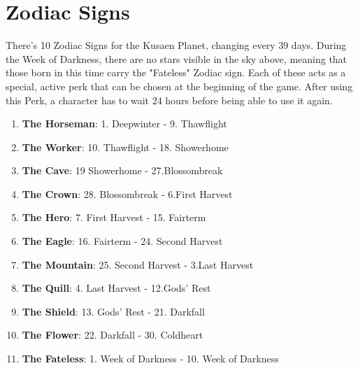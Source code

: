 \section{Zodiac Signs}
There's 10 Zodiac Signs for the Kusaen Planet, changing every 39 days. During the Week of Darkness, there are no stars visible in the sky above, meaning that those born in this time carry the "Fateless" Zodiac sign. Each of these acts as a special, active perk that can be chosen at the beginning of the game. After using this Perk, a character has to wait 24 hours before being able to use it again.\\

\begin{enumerate}
	\item \textbf{The Horseman}: 1. Deepwinter - 9. Thawflight
	\item \textbf{The Worker}: 10. Thawflight - 18. Showerhome
	\item \textbf{The Cave}: 19 Showerhome - 27.Blossombreak
	\item \textbf{The Crown}: 28. Blossombreak - 6.First Harvest
	\item \textbf{The Hero}: 7. First Harvest - 15. Fairterm
	\item \textbf{The Eagle}: 16. Fairterm - 24. Second Harvest
	\item \textbf{The Mountain}: 25. Second Harvest - 3.Last Harvest
	\item \textbf{The Quill}: 4. Last Harvest - 12.Gods' Rest
	\item \textbf{The Shield}: 13. Gods' Rest - 21. Darkfall
	\item \textbf{The Flower}: 22. Darkfall - 30. Coldheart
	\item \textbf{The Fateless}: 1. Week of Darkness - 10. Week of Darkness
\end{enumerate}























